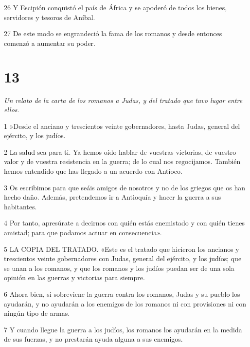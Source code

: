 \par 26 Y Escipión conquistó el país de África y se apoderó de todos los bienes, servidores y tesoros de Aníbal.

\par 27 De este modo se engrandeció la fama de los romanos y desde entonces comenzó a aumentar su poder.

\chapter{13}

\par \textit{Un relato de la carta de los romanos a Judas, y del tratado que tuvo lugar entre ellos.}

\par 1 »Desde el anciano y trescientos veinte gobernadores, hasta Judas, general del ejército, y los judíos.

\par 2 La salud sea para ti. Ya hemos oído hablar de vuestras victorias, de vuestro valor y de vuestra resistencia en la guerra; de lo cual nos regocijamos. También hemos entendido que has llegado a un acuerdo con Antíoco.

\par 3 Os escribimos para que seáis amigos de nosotros y no de los griegos que os han hecho daño. Además, pretendemos ir a Antioquía y hacer la guerra a sus habitantes.

\par 4 Por tanto, apresúrate a decirnos con quién estás enemistado y con quién tienes amistad; para que podamos actuar en consecuencia».

\par 5 LA COPIA DEL TRATADO. «Este es el tratado que hicieron los ancianos y trescientos veinte gobernadores con Judas, general del ejército, y los judíos; que se unan a los romanos, y que los romanos y los judíos puedan ser de una sola opinión en las guerras y victorias para siempre.

\par 6 Ahora bien, si sobreviene la guerra contra los romanos, Judas y su pueblo los ayudarán, y no ayudarán a los enemigos de los romanos ni con provisiones ni con ningún tipo de armas.

\par 7 Y cuando llegue la guerra a los judíos, los romanos los ayudarán en la medida de sus fuerzas, y no prestarán ayuda alguna a sus enemigos.

